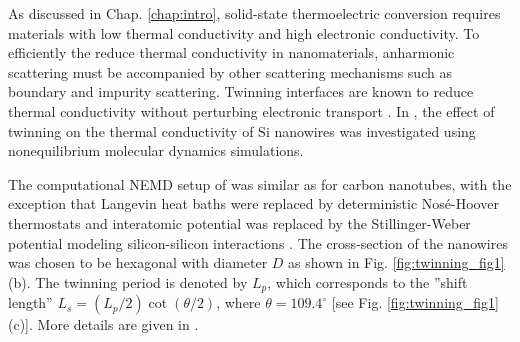 As discussed in Chap. \ref{chap:intro}, solid-state thermoelectric conversion requires materials with low thermal conductivity and high electronic conductivity. To efficiently the reduce thermal conductivity in nanomaterials, anharmonic scattering must be accompanied by other scattering mechanisms such as boundary and impurity scattering. Twinning interfaces are known to reduce thermal conductivity without perturbing electronic transport \cite{}. In , the effect of twinning on the thermal conductivity of Si nanowires was investigated using nonequilibrium molecular dynamics simulations.



The computational NEMD setup of  was similar as for carbon nanotubes, with the exception that Langevin heat baths were replaced by deterministic Nos\'e-Hoover thermostats \cite{nose84} and interatomic potential was replaced by the Stillinger-Weber potential modeling silicon-silicon interactions \cite{stillinger85}. The cross-section of the nanowires was chosen to be hexagonal with diameter $D$ as shown in Fig. \ref{fig:twinning_fig1}(b). The twinning period is denoted by $L_p$, which corresponds to the ''shift length'' $L_s=(L_p/2)\cot(\theta/2)$, where $\theta=109.4^{\circ}$ [see Fig. \ref{fig:twinning_fig1}(c)]. More details are given in .


